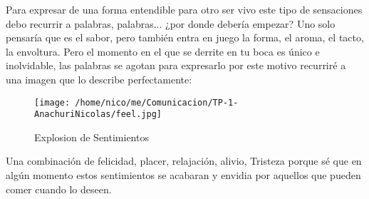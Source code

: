 \documentclass[11pt]{article}
\begin{document}
Para expresar de una forma entendible para otro ser vivo este tipo de sensaciones debo recurrir a palabras, palabras... ¿por donde debería empezar? Uno solo pensaría que es el sabor, pero también entra en juego la forma, el aroma, el tacto, la envoltura. Pero el momento en el que se derrite en tu boca es único e inolvidable, las palabras se agotan para expresarlo por este motivo recurriré a una imagen que lo describe perfectamente:

\clearpage

\begin{wrapfigure}{l}{0.6\linewidth}
  

  \centering
  \texttt{[image: /home/nico/me/Comunicacion/TP-1-AnachuriNicolas/feel.jpg]}
  \caption{Explosion de Sentimientos}
  \label{fig:etiqueta}

\end{wrapfigure}

Una combinación de felicidad, placer, relajación, alivio, Tristeza porque sé que en algún momento estos sentimientos se acabaran y envidia por aquellos que pueden comer cuando lo deseen. 
\end{document}
